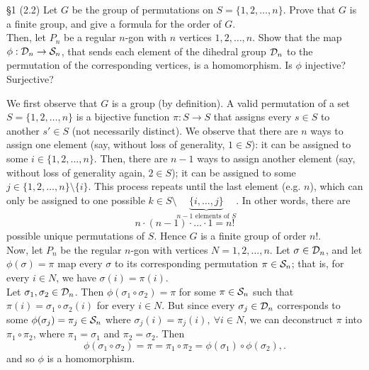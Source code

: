 \documentclass{homework}
\begin{document}
\begin{problem}{\S 1}
  (2.2) Let $G$ be the group of permutations on $S=\{1,2,\ldots,n\}$. Prove that $G$ is a finite group,
  and give a formula for the order of $G$.\\

  Then, let $P_n$ be a regular $n$-gon with $n$ vertices $1,2,\ldots,n$. Show that the map
  $\phi:\mathcal{D}_n\to \mathcal{S}_n$, that sends each element of the dihedral group $\mathcal{D}_n$ to the
  permutation of the corresponding vertices, is a homomorphism. Is $\phi$ injective? Surjective?
\end{problem}

\begin{solution}
  We first observe that $G$ is a group (by definition). A valid permutation of a set $S=\{
  1,2,\ldots,n \}$ is a bijective function $\pi:S\to S$ that assigns every $s \in S$ to another $s'
  \in S$ (not necessarily distinct). We observe that there are $n$ ways to assign one element (say,
  without loss of generality, $1\in S$): it can be assigned to some $i\in \{1,2,\ldots,n\}$. Then,
  there are $n-1$ ways to assign another element (say, without loss of generality again, $2\in S$);
  it can be assigned to some $j\in \{ 1,2,\ldots,n \}\setminus \{ i \}$. This process repeats until
  the last element (e.g.  $n$), which can only be assigned to one possible $k\in S\setminus
  \underbrace{\{i,\ldots,j\}}_{\text{$n-1$ elements of $S$}}$. In other words, there are \[
    n\cdot (n-1)\cdot \ldots\cdot 1 = n!
  \] possible unique permutations of $S$. Hence $G$ is a finite group of order $n!$.\\

  Now, let $P_n$ be the regular $n$-gon with vertices $N={1,2,\ldots,n}$. Let $\sigma\in \mathcal{D}_n$,
  and let $\phi(\sigma)=\pi$ map every $\sigma$ to its corresponding permutation $\pi\in \mathcal{S}_n$;
  that is, for every $i \in N$, we have $\sigma(i)=\pi(i)$. \\
  Let $\sigma_1,\sigma_2\in \mathcal{D}_n$. Then $\phi(\sigma_1\circ \sigma_2)=\pi$ for some $\pi\in
  \mathcal{S}_n$ such that $\pi(i)=\sigma_1\circ \sigma_2(i)$ for every $i\in N$. But since every $
  \sigma_j \in \mathcal{D}_n$ corresponds to some $\phi(\sigma_j)=\pi_j\in \mathcal{S}_n$ where $
  \sigma_j(i)=\pi_j(i),\ \forall i\in N$, we can deconstruct $\pi$ into $\pi_1\circ \pi_2$, where
  $\pi_1=\sigma_1$ and $\pi_2=\sigma_2$. Then \[
    \phi(\sigma_1\circ \sigma_2)=\pi=\pi_1\circ \pi_2=\phi(\sigma_1)\circ \phi(\sigma_2),
  .\] and so $\phi$ is a homomorphism.


\end{solution}
\end{document}
